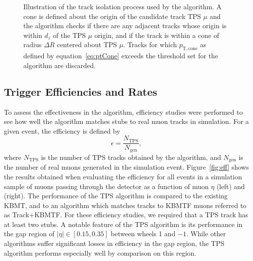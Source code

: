\begin{figure}[htbp]
  \centering
  
  \caption{
    Illustration of the track isolation process used by the algorithm.
    A cone is defined about the origin of the candidate track TPS $\mu$ and the algorithm checks if there are any adjacent tracks whose origin is within $d_z$ of the TPS $\mu$ origin, and if the track is within a cone of radius $\Delta R$ centered about TPS $\mu$.
    Tracks for which $p_\mathrm{T,cone}$ as defined by equation~\ref{eq:ptCone} exceeds the threshold set for the algorithm are discarded.
  }
  \label{fig:isol}
\end{figure}

\subsection{Trigger Efficiencies and Rates}
\label{subsec:effRates}

To assess the effectiveness in the algorithm, efficiency studies were performed to see how well the algorithm matches stubs to real muon tracks in simulation.
For a given event, the efficiency is defined by
\begin{equation}\label{eq:eff}
  \epsilon=\frac{N_\mathrm{TPS}}{N_\mathrm{gen}},
\end{equation}
where $N_\mathrm{TPS}$ is the number of TPS tracks obtained by the algorithm, and $N_\mathrm{gen}$ is the number of real muons generated in the simulation event.
Figure~\ref{fig:eff} shows the results obtained when evaluating the efficiency for all events in a simulation sample of muons passing through the detector as a function of muon $\eta$ (left) and \pt (right).
The performance of the TPS algorithm is compared to the existing KBMT, and to an algorithm which matches tracks to KBMTF muons referred to as Track+KBMTF.
For these efficiency studies, we required that a TPS track has at least two stubs.
A notable feature of the TPS algorithm is its performance in the gap region of $|\eta|\in[0.15,0.35]$ between wheels 1 and $-1$.
While other algorithms suffer significant losses in efficiency in the gap region, the TPS algorithm performs especially well by comparison on this region.


